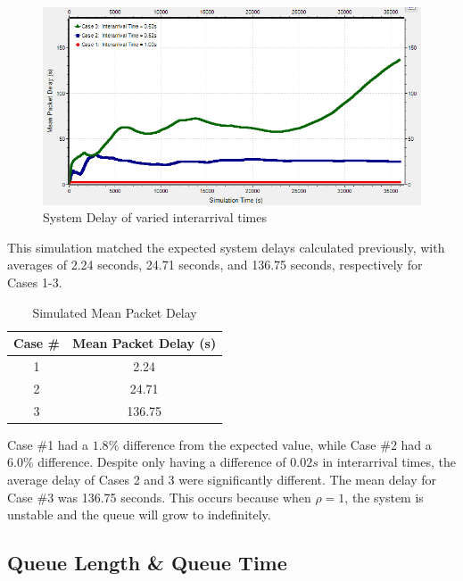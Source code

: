 \documentclass{article}
\begin{document}
\begin{figure}[h!]
	\begin{center}
	\includegraphics[scale=0.85]{Images/DelayPlot.PNG}
	\vspace{-.25cm}
	\caption{System Delay of varied interarrival times}
	\label{DelayPlot}
	\end{center}
\end{figure}

This simulation matched the expected system delays calculated previously, with averages of 2.24 seconds, 24.71 seconds, and 136.75 seconds, respectively for Cases 1-3.

\begin{table}[h!]
\centering
\begin{tabular}{|c|c|} \hline
\textbf{Case \#} & \textbf{Mean Packet Delay (s)} \\ \hline
1 & 2.24  \\ \hline
2 & 24.71 \\ \hline
3 & 136.75  \\ \hline 
\end{tabular}
\caption{Simulated Mean Packet Delay}
\label{tab:meanPacketDelay}
\end{table}


Case \#1 had a $1.8\%$ difference from the expected value, while Case \#2 had a $6.0\%$ difference.
Despite only having a difference of $0.02s$ in interarrival times, the average delay of Cases 2 and 3 were significantly different. 
The mean delay for Case \#3 was 136.75 seconds.  
This occurs because when $\rho = 1$, the system is unstable and the queue will grow to indefinitely.

\newpage
\subsection{Queue Length \& Queue Time}
\end{document}
